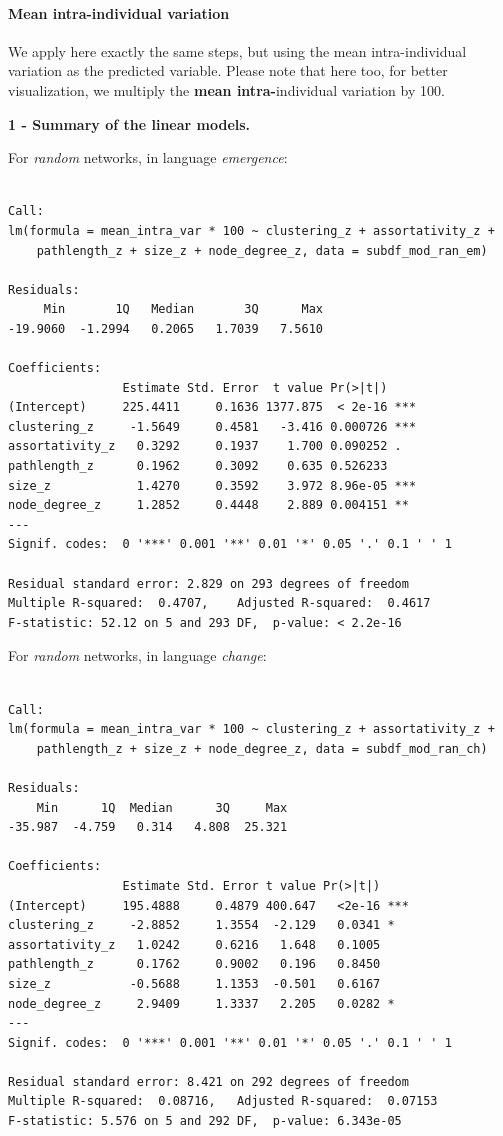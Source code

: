 \documentclass[
]{article}
\begin{document}
\hypertarget{mean-intra-individual-variation}{%
\paragraph{Mean intra-individual
variation}\label{mean-intra-individual-variation}}

We apply here exactly the same steps, but using the mean
intra-individual variation as the predicted variable. Please note that
here too, for better visualization, we multiply the \textbf{mean
intra-}individual variation by 100.

\textbf{1 - Summary of the linear models.}

For \emph{random} networks, in language \emph{emergence}:

\begin{verbatim}

Call:
lm(formula = mean_intra_var * 100 ~ clustering_z + assortativity_z + 
    pathlength_z + size_z + node_degree_z, data = subdf_mod_ran_em)

Residuals:
     Min       1Q   Median       3Q      Max 
-19.9060  -1.2994   0.2065   1.7039   7.5610 

Coefficients:
                Estimate Std. Error  t value Pr(>|t|)    
(Intercept)     225.4411     0.1636 1377.875  < 2e-16 ***
clustering_z     -1.5649     0.4581   -3.416 0.000726 ***
assortativity_z   0.3292     0.1937    1.700 0.090252 .  
pathlength_z      0.1962     0.3092    0.635 0.526233    
size_z            1.4270     0.3592    3.972 8.96e-05 ***
node_degree_z     1.2852     0.4448    2.889 0.004151 ** 
---
Signif. codes:  0 '***' 0.001 '**' 0.01 '*' 0.05 '.' 0.1 ' ' 1

Residual standard error: 2.829 on 293 degrees of freedom
Multiple R-squared:  0.4707,    Adjusted R-squared:  0.4617 
F-statistic: 52.12 on 5 and 293 DF,  p-value: < 2.2e-16
\end{verbatim}

For \emph{random} networks, in language \emph{change}:

\begin{verbatim}

Call:
lm(formula = mean_intra_var * 100 ~ clustering_z + assortativity_z + 
    pathlength_z + size_z + node_degree_z, data = subdf_mod_ran_ch)

Residuals:
    Min      1Q  Median      3Q     Max 
-35.987  -4.759   0.314   4.808  25.321 

Coefficients:
                Estimate Std. Error t value Pr(>|t|)    
(Intercept)     195.4888     0.4879 400.647   <2e-16 ***
clustering_z     -2.8852     1.3554  -2.129   0.0341 *  
assortativity_z   1.0242     0.6216   1.648   0.1005    
pathlength_z      0.1762     0.9002   0.196   0.8450    
size_z           -0.5688     1.1353  -0.501   0.6167    
node_degree_z     2.9409     1.3337   2.205   0.0282 *  
---
Signif. codes:  0 '***' 0.001 '**' 0.01 '*' 0.05 '.' 0.1 ' ' 1

Residual standard error: 8.421 on 292 degrees of freedom
Multiple R-squared:  0.08716,   Adjusted R-squared:  0.07153 
F-statistic: 5.576 on 5 and 292 DF,  p-value: 6.343e-05
\end{verbatim}
\end{document}
